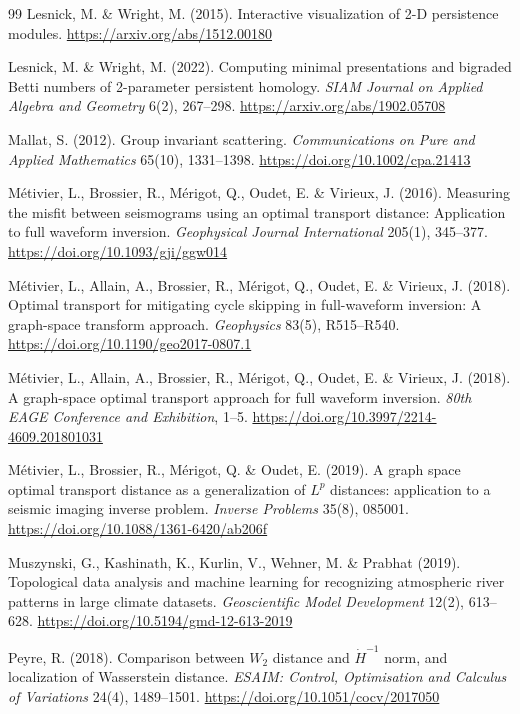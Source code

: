 \documentclass[11pt]{article}
\begin{document}
\begin{thebibliography}{99}
 Lesnick, M. \& Wright, M. (2015). Interactive visualization of 2-D
persistence modules. \url{https://arxiv.org/abs/1512.00180}

 Lesnick, M. \& Wright, M. (2022). Computing minimal presentations
and bigraded Betti numbers of 2-parameter persistent homology.
\emph{SIAM Journal on Applied Algebra and Geometry} 6(2), 267--298.
\url{https://arxiv.org/abs/1902.05708}

 Mallat, S. (2012). Group invariant scattering.
\emph{Communications on Pure and Applied Mathematics} 65(10), 1331--1398.
\url{https://doi.org/10.1002/cpa.21413}

 M\'etivier, L., Brossier, R., M\'erigot, Q., Oudet, E. \& Virieux,
J. (2016). Measuring the misfit between seismograms using an optimal transport distance:
Application to full waveform inversion. \emph{Geophysical Journal International} 205(1),
345--377. \url{https://doi.org/10.1093/gji/ggw014}

 M\'etivier, L., Allain, A., Brossier, R., M\'erigot, Q.,
Oudet, E. \& Virieux, J. (2018). Optimal transport for mitigating cycle skipping in
full-waveform inversion: A graph-space transform approach. \emph{Geophysics} 83(5),
R515--R540. \url{https://doi.org/10.1190/geo2017-0807.1}

 M\'etivier, L., Allain, A., Brossier, R., M\'erigot, Q., Oudet, E.
\& Virieux, J. (2018). A graph-space optimal transport approach for full waveform inversion.
\emph{80th EAGE Conference and Exhibition}, 1--5.
\url{https://doi.org/10.3997/2214-4609.201801031}

 M\'etivier, L., Brossier, R., M\'erigot, Q. \& Oudet, E. (2019). A
graph space optimal transport distance as a generalization of $L^p$ distances: application to
a seismic imaging inverse problem. \emph{Inverse Problems} 35(8), 085001.
\url{https://doi.org/10.1088/1361-6420/ab206f}

 Muszynski, G., Kashinath, K., Kurlin, V., Wehner, M. \& Prabhat
(2019). Topological data analysis and machine learning for recognizing atmospheric river
patterns in large climate datasets. \emph{Geoscientific Model Development} 12(2), 613--628.
\url{https://doi.org/10.5194/gmd-12-613-2019}

 Peyre, R. (2018). Comparison between $W_2$ distance and $\dot H^{-1}$
norm, and localization of Wasserstein distance.
\emph{ESAIM: Control, Optimisation and Calculus of Variations} 24(4), 1489--1501.
\url{https://doi.org/10.1051/cocv/2017050}


\end{thebibliography}
\end{document}
